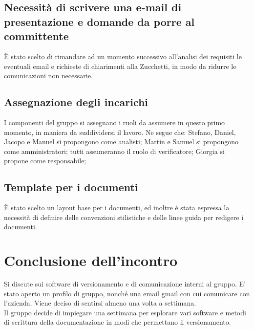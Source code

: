 \documentclass{article}
\begin{document}
\subsection{Necessità di scrivere una e-mail di presentazione e domande da porre al committente}%
\label{sub:piattaforma_trello}
È stato scelto di rimandare ad un momento successivo all’analisi dei requisiti le eventuali email e richieste di chiarimenti alla Zucchetti, in modo da ridurre le comunicazioni non necessarie.

\subsection{Assegnazione degli incarichi}%
\label{sub:mezzo_comunicazione}
I componenti del gruppo si assegnano i ruoli da assumere in questo primo momento, in maniera da suddividersi il lavoro. Ne segue che: Stefano, Daniel, Jacopo e Manuel si propongono come analisti;  Martin e Samuel si propongono come amministratori; tutti assumeranno il ruolo di verificatore; Giorgia si propone come responsabile; 

\subsection{Template per i documenti}%
\label{sub:latex}
È stato scelto un layout base per i documenti, ed inoltre è stata espressa la necessità di definire delle convenzioni stilistiche e delle linee guida per redigere i documenti.

\section{Conclusione dell’incontro}%
\label{sec:conclusione_incontro}
Si discute sui software di versionamento e di comunicazione interni al gruppo. E’ stato aperto un profilo  di gruppo, nonché una email gmail con cui comunicare con l’azienda. 
Viene deciso di sentirsi almeno una volta a settimana. \\
Il gruppo decide di impiegare una settimana per esplorare vari software e metodi di scrittura della documentazione in modi che permettano il versionamento.
\end{document}
